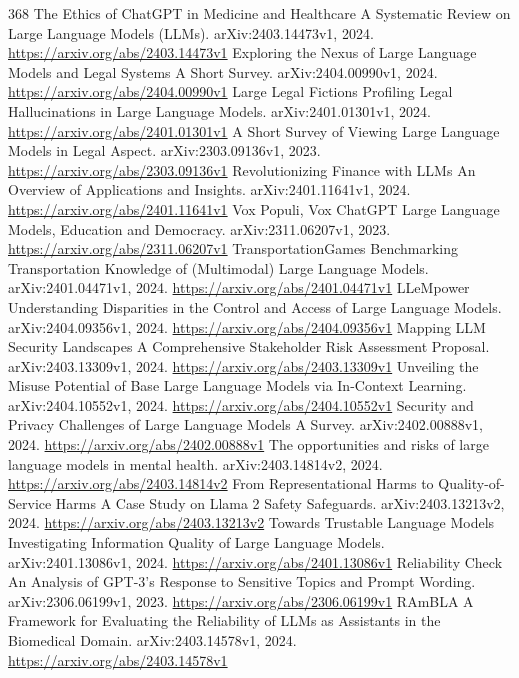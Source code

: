 \documentclass[11pt]{article}
\begin{document}
\begin{thebibliography}{368}
 The Ethics of ChatGPT in Medicine and Healthcare A Systematic Review on Large Language Models (LLMs). arXiv:2403.14473v1, 2024. \url{https://arxiv.org/abs/2403.14473v1}
 Exploring the Nexus of Large Language Models and Legal Systems A Short Survey. arXiv:2404.00990v1, 2024. \url{https://arxiv.org/abs/2404.00990v1}
 Large Legal Fictions Profiling Legal Hallucinations in Large Language Models. arXiv:2401.01301v1, 2024. \url{https://arxiv.org/abs/2401.01301v1}
 A Short Survey of Viewing Large Language Models in Legal Aspect. arXiv:2303.09136v1, 2023. \url{https://arxiv.org/abs/2303.09136v1}
 Revolutionizing Finance with LLMs An Overview of Applications and Insights. arXiv:2401.11641v1, 2024. \url{https://arxiv.org/abs/2401.11641v1}
 Vox Populi, Vox ChatGPT Large Language Models, Education and Democracy. arXiv:2311.06207v1, 2023. \url{https://arxiv.org/abs/2311.06207v1}
 TransportationGames Benchmarking Transportation Knowledge of (Multimodal) Large Language Models. arXiv:2401.04471v1, 2024. \url{https://arxiv.org/abs/2401.04471v1}
 LLeMpower Understanding Disparities in the Control and Access of Large Language Models. arXiv:2404.09356v1, 2024. \url{https://arxiv.org/abs/2404.09356v1}
 Mapping LLM Security Landscapes A Comprehensive Stakeholder Risk Assessment Proposal. arXiv:2403.13309v1, 2024. \url{https://arxiv.org/abs/2403.13309v1}
 Unveiling the Misuse Potential of Base Large Language Models via In-Context Learning. arXiv:2404.10552v1, 2024. \url{https://arxiv.org/abs/2404.10552v1}
 Security and Privacy Challenges of Large Language Models A Survey. arXiv:2402.00888v1, 2024. \url{https://arxiv.org/abs/2402.00888v1}
 The opportunities and risks of large language models in mental health. arXiv:2403.14814v2, 2024. \url{https://arxiv.org/abs/2403.14814v2}
 From Representational Harms to Quality-of-Service Harms A Case Study on Llama 2 Safety Safeguards. arXiv:2403.13213v2, 2024. \url{https://arxiv.org/abs/2403.13213v2}
 Towards Trustable Language Models Investigating Information Quality of Large Language Models. arXiv:2401.13086v1, 2024. \url{https://arxiv.org/abs/2401.13086v1}
 Reliability Check An Analysis of GPT-3's Response to Sensitive Topics and Prompt Wording. arXiv:2306.06199v1, 2023. \url{https://arxiv.org/abs/2306.06199v1}
 RAmBLA A Framework for Evaluating the Reliability of LLMs as Assistants in the Biomedical Domain. arXiv:2403.14578v1, 2024. \url{https://arxiv.org/abs/2403.14578v1}

\end{thebibliography}
\end{document}
